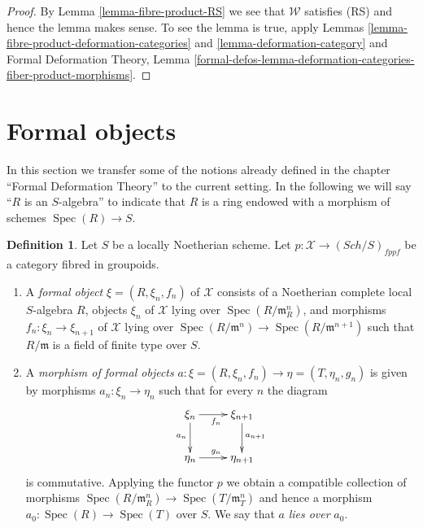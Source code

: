 \documentclass{stacks-project}
\theoremstyle{plain}
\theoremstyle{definition}
\newtheorem{definition}[subsection]{Definition}
\theoremstyle{remark}
\numberwithin{equation}{subsection}
\def\Spec{\mathop{\mathrm{Spec}}}
\def\Sch{\mathit{Sch}}
\begin{document}
\begin{proof}
By Lemma \ref{lemma-fibre-product-RS} we see that $\mathcal{W}$
satisfies (RS) and hence the lemma makes sense. To see the lemma
is true, apply Lemmas \ref{lemma-fibre-product-deformation-categories} and
\ref{lemma-deformation-category}
and Formal Deformation Theory, Lemma
\ref{formal-defos-lemma-deformation-categories-fiber-product-morphisms}.
\end{proof}






\section{Formal objects}
\label{section-formal-objects}

\noindent
In this section we transfer some of the notions already defined
in the chapter ``Formal Deformation Theory'' to the current setting.
In the following we will say ``$R$ is an $S$-algebra'' to indicate
that $R$ is a ring endowed with a morphism of schemes $\Spec(R) \to S$.

\begin{definition}
\label{definition-formal-objects}
Let $S$ be a locally Noetherian scheme. Let
$p : \mathcal{X} \to (\Sch/S)_{fppf}$ be a category fibred in groupoids.
\begin{enumerate}
\item A {\it formal object} $\xi = (R, \xi_n, f_n)$ of $\mathcal{X}$ consists
of a Noetherian complete local $S$-algebra $R$, objects $\xi_n$ of
$\mathcal{X}$ lying over $\Spec(R/\mathfrak m_R^n)$, and morphisms
$f_n : \xi_n \to \xi_{n + 1}$ of $\mathcal{X}$ lying over
$\Spec(R/\mathfrak m^n) \to \Spec(R/\mathfrak m^{n + 1})$
such that $R/\mathfrak m$ is a field of finite type over $S$.
\item A {\it morphism of formal objects}
$a : \xi = (R, \xi_n, f_n) \to \eta = (T, \eta_n, g_n)$
is given by morphisms $a_n : \xi_n \to \eta_n$ such that for every $n$
the diagram
$$
\xymatrix{
\xi_n \ar[r]_{f_n} \ar[d]_{a_n} & \xi_{n + 1} \ar[d]^{a_{n + 1}} \\
\eta_n \ar[r]^{g_n} & \eta_{n + 1}
}
$$
is commutative. Applying the functor $p$ we obtain a compatible collection
of morphisms $\Spec(R/\mathfrak m_R^n) \to \Spec(T/\mathfrak m_T^n)$ and
hence a morphism $a_0 : \Spec(R) \to \Spec(T)$ over $S$. We say that
$a$ {\it lies over} $a_0$.
\end{enumerate}
\end{definition}
\end{document}
